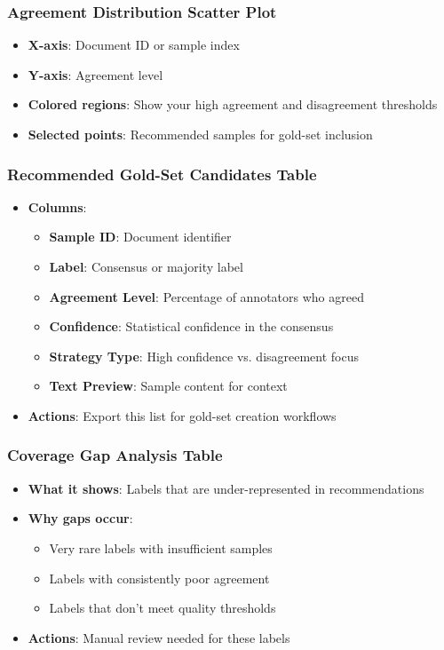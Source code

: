 \documentclass[11pt]{article}
\begin{document}
\subsubsection{Agreement Distribution Scatter Plot}
\begin{itemize}
\item \textbf{X-axis}: Document ID or sample index
\item \textbf{Y-axis}: Agreement level
\item \textbf{Colored regions}: Show your high agreement and disagreement thresholds
\item \textbf{Selected points}: Recommended samples for gold-set inclusion
\end{itemize}

\subsubsection{Recommended Gold-Set Candidates Table}
\begin{itemize}
\item \textbf{Columns}:
\begin{itemize}
\item \textbf{Sample ID}: Document identifier
\item \textbf{Label}: Consensus or majority label
\item \textbf{Agreement Level}: Percentage of annotators who agreed
\item \textbf{Confidence}: Statistical confidence in the consensus
\item \textbf{Strategy Type}: High confidence vs. disagreement focus
\item \textbf{Text Preview}: Sample content for context
\end{itemize}
\item \textbf{Actions}: Export this list for gold-set creation workflows
\end{itemize}

\subsubsection{Coverage Gap Analysis Table}
\begin{itemize}
\item \textbf{What it shows}: Labels that are under-represented in recommendations
\item \textbf{Why gaps occur}:
\begin{itemize}
\item Very rare labels with insufficient samples
\item Labels with consistently poor agreement
\item Labels that don't meet quality thresholds
\end{itemize}
\item \textbf{Actions}: Manual review needed for these labels
\end{itemize}
\end{document}

